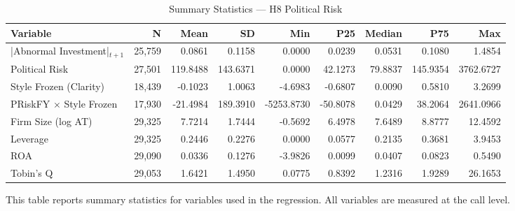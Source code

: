 \begin{table}[htbp]
\centering
\caption{Summary Statistics — H8 Political Risk}
\label{tab:summary_stats_h8}
\begin{tabular}{lrrrrrrrr}
\toprule
Variable & N & Mean & SD & Min & P25 & Median & P75 & Max \\
\midrule
|Abnormal Investment|$_{t+1}$ & 25,759 & 0.0861 & 0.1158 & 0.0000 & 0.0239 & 0.0531 & 0.1080 & 1.4854 \\
Political Risk & 27,501 & 119.8488 & 143.6371 & 0.0000 & 42.1273 & 79.8837 & 145.9354 & 3762.6727 \\
Style Frozen (Clarity) & 18,439 & -0.1023 & 1.0063 & -4.6983 & -0.6807 & 0.0090 & 0.5810 & 3.2699 \\
PRiskFY $\times$ Style Frozen & 17,930 & -21.4984 & 189.3910 & -5253.8730 & -50.8078 & 0.0429 & 38.2064 & 2641.0966 \\
Firm Size (log AT) & 29,325 & 7.7214 & 1.7444 & -0.5692 & 6.4978 & 7.6489 & 8.8777 & 12.4592 \\
Leverage & 29,325 & 0.2446 & 0.2276 & 0.0000 & 0.0577 & 0.2135 & 0.3681 & 3.9453 \\
ROA & 29,090 & 0.0336 & 0.1276 & -3.9826 & 0.0099 & 0.0407 & 0.0823 & 0.5490 \\
Tobin's Q & 29,053 & 1.6421 & 1.4950 & 0.0775 & 0.8392 & 1.2316 & 1.9289 & 26.1653 \\
\bottomrule
\end{tabular}
\begin{tablenotes}
\small
\item This table reports summary statistics for variables used in the regression.
All variables are measured at the call level.
\end{tablenotes}
\end{table}